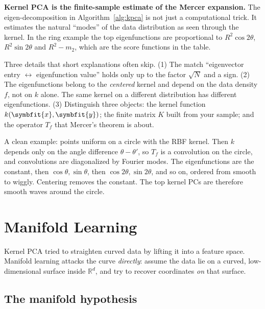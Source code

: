 \documentclass[11pt]{article}
\newcommand{\bm}[1]{\symbfit{#1}}
\newcommand{\R}{\mathbb{R}}
\newcommand{\vx}{\bm{x}}
\newcommand{\vy}{\bm{y}}
\begin{document}
\begin{intuition}
\textbf{Kernel PCA is the finite-sample estimate of the Mercer expansion.} The eigen-decomposition
in Algorithm~\ref{alg:kpca} is not just a computational trick. It estimates the natural ``modes''
of the data distribution as seen through the kernel. In the ring example the top eigenfunctions
are proportional to $R^2\cos2\theta$, $R^2\sin2\theta$ and $R^2-m_2$, which are the score functions in the table.
\end{intuition}

\begin{careful}
Three details that short explanations often skip. (1) The match ``eigenvector entry $\leftrightarrow$
eigenfunction value'' holds only up to the factor $\sqrt N$ and a sign. (2) The eigenfunctions
belong to the \emph{centered} kernel and depend on the data density $f$, not on $k$ alone. The same kernel on a
different distribution has different eigenfunctions. (3) Distinguish three objects: the kernel
function $k(\vx,\vy)$; the finite matrix $K$ built from your sample; and the operator $T_f$ that
Mercer's theorem is about.
\end{careful}

\begin{deeper}
A clean example: points uniform on a circle with the RBF kernel. Then $k$ depends only on the angle
difference $\theta-\theta'$, so $T_f$ is a convolution on the circle, and convolutions are diagonalized by
Fourier modes. The eigenfunctions are the constant, then $\cos\theta,\sin\theta$, then
$\cos2\theta,\sin2\theta$, and so on, ordered from smooth to wiggly. Centering removes the constant. The
top kernel PCs are therefore smooth waves around the circle.
\end{deeper}

\section{Manifold Learning}\label{sec:manifold}

Kernel PCA tried to straighten curved data by lifting it into a feature space. Manifold learning attacks the curve
\emph{directly}: assume the data lie on a curved, low-dimensional surface inside $\R^d$, and try to recover coordinates
\emph{on} that surface.

\subsection{The manifold hypothesis}
\end{document}
